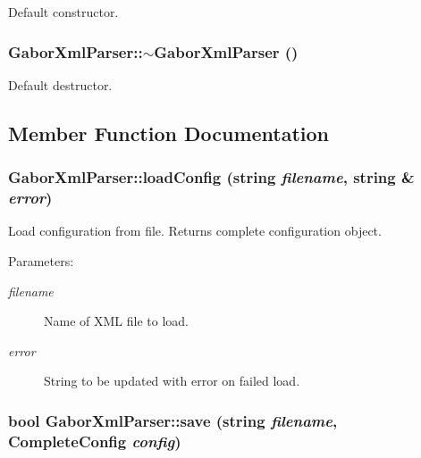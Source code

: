 Default constructor. \hypertarget{classGaborXmlParser_e834789f7d64688cf343ee2a84e299b5}{
\subsubsection[{$\sim$GaborXmlParser}]{\setlength{\rightskip}{0pt plus 5cm}GaborXmlParser::$\sim$GaborXmlParser ()}}
\label{classGaborXmlParser_e834789f7d64688cf343ee2a84e299b5}


Default destructor. 

\subsection{Member Function Documentation}
\hypertarget{classGaborXmlParser_a03d1e604ec6e694d831d4cc6aa45465}{
\subsubsection[{loadConfig}]{ GaborXmlParser::loadConfig (string {\em filename}, \/  string \& {\em error})}}
\label{classGaborXmlParser_a03d1e604ec6e694d831d4cc6aa45465}


Load configuration from file. Returns complete configuration object. \begin{Desc}
\item[Parameters:]
\begin{description}
\item[{\em filename}]Name of XML file to load. \item[{\em error}]String to be updated with error on failed load. \end{description}
\end{Desc}
\hypertarget{classGaborXmlParser_fbf69ecd4a1e4354093c908e4e03fab3}{
\subsubsection[{save}]{\setlength{\rightskip}{0pt plus 5cm}bool GaborXmlParser::save (string {\em filename}, \/  {\bf CompleteConfig} {\em config})}}
\label{classGaborXmlParser_fbf69ecd4a1e4354093c908e4e03fab3}


